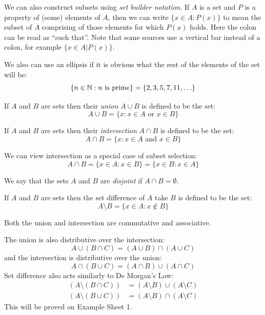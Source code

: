 \documentclass[../main.tex]{subfiles}
\begin{document}
We can also construct subsets using \textit{set builder notation}.
If $A$ is a set and $P$ is a property of (some) elements of $A$, then we can write $\{x \in A: P(x)\}$ to mean the subset of $A$ comprising of those elements for which $P(x)$ holds.
Here the colon can be read as ``such that''.
Note that some sources use a vertical bar instead of a colon, for example $\{x \in A \vert P(x)\}$.
\begin{example}
  We also can use an ellipsis if it is obvious what the rest of the elements of the set will be:
  \[
    \{n \in \mathbb{N} : n \text{ is prime}\} = \{2, 3, 5, 7, 11, \ldots\}
  \]
\end{example}
\begin{definition}[Union]
  If $A$ and $B$ are sets then their \textit{union} $A \cup B$ is defined to be the set:
  \[
    A \cup B = \{x: x \in A \text{ or } x \in B\}
  \]
\end{definition}
\begin{definition}[Intersection]
  If $A$ and $B$ are sets then their \textit{intersection} $A \cap B$ is defined to be the set:
  \[
    A \cap B = \{x: x \in A \text{ and } x \in B\}
  \]
\end{definition}
\begin{remark}[Remark]
  We can view intersection as a special case of subset selection:
  \[
    A \cap B = \{x \in A : x \in B\} = \{x \in B: x \in A\}
  \]
\end{remark}
\begin{definition}[Disjoint]
  We say that the sets $A$ and $B$ are \textit{disjoint} if $A \cap B = \emptyset$.
\end{definition}
\begin{definition}
  If $A$ and $B$ are sets then the set difference of $A$ take $B$ is defined to be the set:
  \[
    A \setminus B = \{x \in A: x \notin B\}
  \]
\end{definition}
\begin{remark}[Note]
  Both the union and intersection are commutative and associative.

  The union is also distributive over the intersection:
  \[
    A \cup (B \cap C) = (A \cup B) \cap (A \cup C)
  \]
  and the intersection is distributive over the union:
  \[
    A \cap (B \cup C) = (A \cap B) \cup (A \cap C)
  \]
  Set difference also acts similarly to De Morgan's Law:
  \begin{align*}
    (A \setminus (B \cap C)) &= (A \setminus B) \cup (A \setminus C) \\
    (A \setminus (B \cup C)) &= (A \setminus B) \cap (A \setminus C)
  \end{align*}
  This will be proved on Example Sheet 1.
\end{remark}
\end{document}
